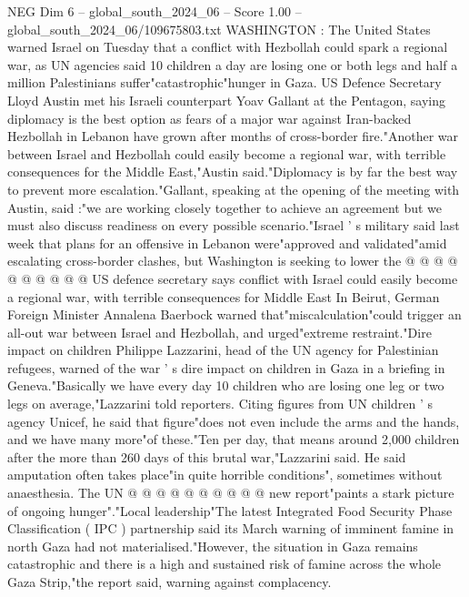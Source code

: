 \begin{textsample}{NEG Dim 6 – global\_south\_2024\_06 – Score 1.00 – global\_south\_2024\_06/109675803.txt}  \label{ex:f6_neg_302}
WASHINGTON : The United States warned Israel on Tuesday that a conflict with Hezbollah could spark a regional war, as UN agencies said 10 children a day are losing one or both legs and half a million Palestinians suffer"catastrophic"hunger in Gaza.
US Defence Secretary Lloyd Austin met his Israeli counterpart Yoav Gallant at the Pentagon, saying diplomacy is the best option as fears of a major war against Iran-backed Hezbollah in Lebanon have grown after months of cross-border fire."Another war between Israel and Hezbollah could easily become a regional war, with terrible consequences for the Middle East,"Austin said."Diplomacy is by far the best way to prevent more escalation."Gallant, speaking at the opening of the meeting with Austin, said :"we are working closely together to achieve an agreement but we must also discuss readiness on every possible scenario."Israel ' s military said last week that plans for an offensive in Lebanon were"approved and validated"amid escalating cross-border clashes, but Washington is seeking to lower the @ @ @ @ @ @ @ @ @ @ US defence secretary says conflict with Israel could easily become a regional war, with terrible consequences for Middle East In Beirut, German Foreign Minister Annalena Baerbock warned that"miscalculation"could trigger an all-out war between Israel and Hezbollah, and urged"extreme restraint."Dire impact on children Philippe Lazzarini, head of the UN agency for Palestinian refugees, warned of the war ' s dire impact on children in Gaza in a briefing in Geneva."Basically we have every day 10 children who are losing one leg or two legs on average,"Lazzarini told reporters.
Citing figures from UN children ' s agency Unicef, he said that figure"does not even include the arms and the hands, and we have many more"of these."Ten per day, that means around 2,000 children after the more than 260 days of this brutal war,"Lazzarini said.
He said amputation often takes place"in quite horrible conditions", sometimes without anaesthesia.
The UN @ @ @ @ @ @ @ @ @ @ new report"paints a stark picture of ongoing hunger"."Local leadership"The latest Integrated Food Security Phase Classification ( IPC ) partnership said its March warning of imminent famine in north Gaza had not materialised."However, the situation in Gaza remains catastrophic and there is a high and sustained risk of famine across the whole Gaza Strip,"the report said, warning against complacency.

\end{textsample}
